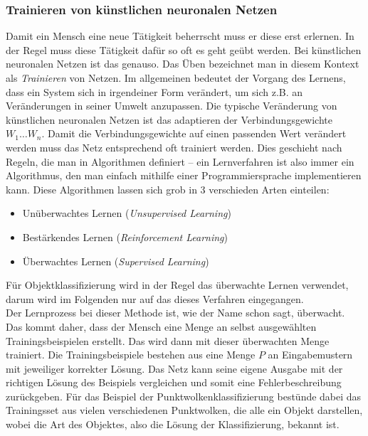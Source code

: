 \subsubsection{Trainieren von künstlichen neuronalen Netzen}
\label{sec:Training}

Damit ein Mensch eine neue Tätigkeit beherrscht muss er diese erst erlernen. In der Regel muss diese Tätigkeit dafür so oft es geht geübt werden. Bei künstlichen neuronalen Netzen ist das genauso. Das Üben bezeichnet man in diesem Kontext als \textit{Trainieren} von Netzen. Im allgemeinen bedeutet der Vorgang des Lernens, dass ein System sich in irgendeiner Form verändert, um sich z.B. an Veränderungen in seiner Umwelt anzupassen. Die typische Veränderung von künstlichen neuronalen Netzen ist das adaptieren der Verbindungsgewichte \(W_1 \dots W_n\). Damit die Verbindungsgewichte auf einen passenden Wert verändert werden muss das Netz entsprechend oft trainiert werden. Dies geschieht nach Regeln, die man in Algorithmen definiert – ein Lernverfahren ist also immer ein Algorithmus, den man einfach mithilfe einer Programmiersprache implementieren kann. Diese Algorithmen lassen sich grob in 3 verschieden Arten einteilen:

\begin{itemize}
\item Unüberwachtes Lernen (\textit{Unsupervised Learning})
\item Bestärkendes Lernen (\textit{Reinforcement Learning})
\item Überwachtes Lernen (\textit{Supervised Learning})
\end{itemize}

Für Objektklassifizierung wird in der Regel das überwachte Lernen verwendet, darum wird im Folgenden nur auf das dieses Verfahren eingegangen.\\
 
Der Lernprozess bei dieser Methode ist, wie der Name schon sagt, überwacht. Das kommt daher, dass der Mensch eine Menge an selbst ausgewählten Trainingsbeispielen erstellt. Das wird dann mit dieser überwachten Menge trainiert. Die Trainingsbeispiele bestehen aus eine Menge \(P\) an Eingabemustern mit jeweiliger korrekter Lösung. Das Netz kann seine eigene Ausgabe mit der richtigen Lösung des Beispiels vergleichen und somit eine Fehlerbeschreibung zurückgeben. Für das Beispiel der Punktwolkenklassifizierung bestünde dabei das Trainingsset aus vielen verschiedenen Punktwolken, die alle ein Objekt darstellen, wobei die Art des Objektes, also die Lösung der Klassifizierung, bekannt ist. \\

